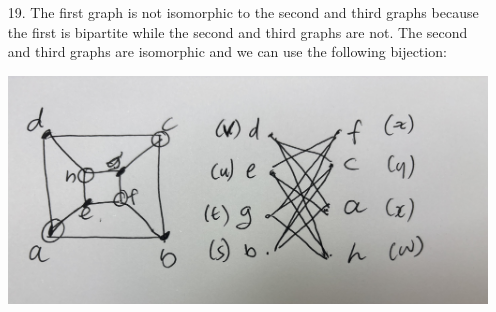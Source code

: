 \documentclass{article}
\begin{document}
\begin{enumerate}
	\item[19.]
		The first graph is not isomorphic to the second and third graphs because the first is bipartite while the second and third graphs are not. The second and third graphs are isomorphic and we can use the following bijection:

		\begin{center}
			\includegraphics[width=0.8\linewidth]{IMG_3377.jpeg}
		\end{center}


\end{enumerate}
\end{document}
